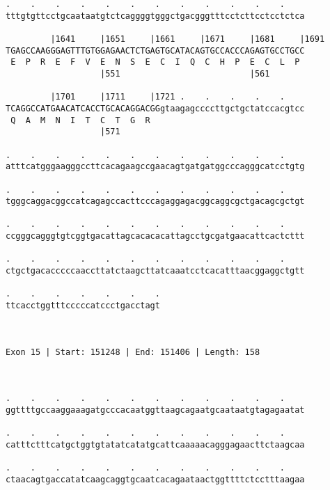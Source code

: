 \documentclass{article}
\begin{document}
\begin{Verbatim}
.    .    .    .    .    .    .    .    .    .    .    .    
tttgtgttcctgcaataatgtctcaggggtgggctgacgggtttcctcttcctcctctca
                                                            
         |1641     |1651     |1661     |1671     |1681     |1691
TGAGCCAAGGGAGTTTGTGGAGAACTCTGAGTGCATACAGTGCCACCCAGAGTGCCTGCC
 E  P  R  E  F  V  E  N  S  E  C  I  Q  C  H  P  E  C  L  P 
                   |551                          |561       
  
         |1701     |1711     |1721 .    .    .    .    .    
TCAGGCCATGAACATCACCTGCACAGGACGGgtaagagccccttgctgctatccacgtcc
 Q  A  M  N  I  T  C  T  G  R                               
                   |571                                     
  
.    .    .    .    .    .    .    .    .    .    .    .    
atttcatgggaagggccttcacagaagccgaacagtgatgatggcccagggcatcctgtg
                                                            
.    .    .    .    .    .    .    .    .    .    .    .    
tgggcaggacggccatcagagccacttcccagaggagacggcaggcgctgacagcgctgt
                                                            
.    .    .    .    .    .    .    .    .    .    .    .    
ccgggcagggtgtcggtgacattagcacacacattagcctgcgatgaacattcactcttt
                                                            
.    .    .    .    .    .    .    .    .    .    .    .    
ctgctgacacccccaaccttatctaagcttatcaaatcctcacatttaacggaggctgtt
                                                            
.    .    .    .    .    .    .
ttcacctggtttcccccatccctgacctagt
                               
                               
 
Exon 15 | Start: 151248 | End: 151406 | Length: 158



.    .    .    .    .    .    .    .    .    .    .    .    
ggttttgccaaggaaagatgcccacaatggttaagcagaatgcaataatgtagagaatat
                                                            
.    .    .    .    .    .    .    .    .    .    .    .    
catttctttcatgctggtgtatatcatatgcattcaaaaacagggagaacttctaagcaa
                                                            
.    .    .    .    .    .    .    .    .    .    .    .    
ctaacagtgaccatatcaagcaggtgcaatcacagaataactggttttctcctttaagaa
                                                            

\end{Verbatim}
\end{document}
